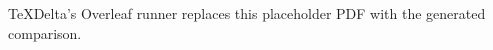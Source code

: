 \documentclass{article}
\begin{document}
TeXDelta's Overleaf runner replaces this placeholder PDF with the generated comparison.
\end{document}
